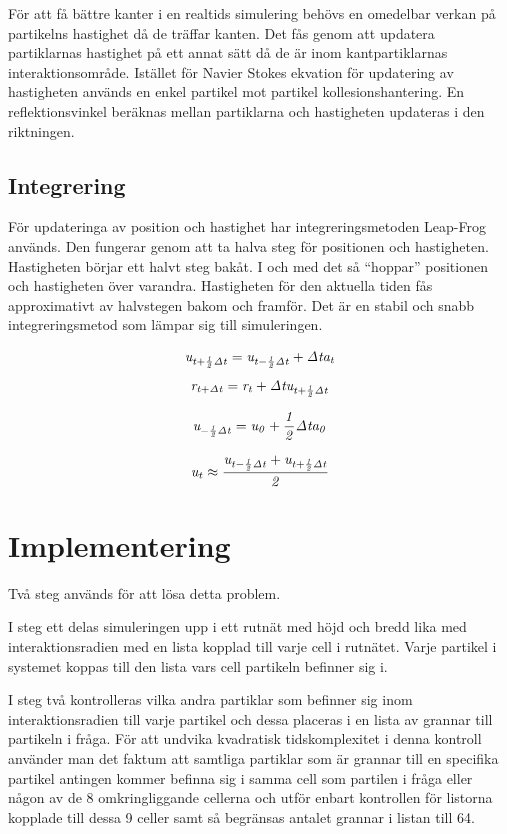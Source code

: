 \documentclass[a4paper,12pt,oneside,final]{extarticle}
\begin{document}
För att få bättre kanter i en realtids simulering behövs en omedelbar verkan på partikelns hastighet då de träffar kanten.
Det fås genom att updatera partiklarnas hastighet på ett annat sätt då de är inom kantpartiklarnas interaktionsområde.
Istället för Navier Stokes ekvation för updatering av hastigheten används en enkel partikel mot partikel kollesionshantering.
En reflektionsvinkel beräknas mellan partiklarna och hastigheten updateras i den riktningen.

\subsection{Integrering}
För updateringa av position och hastighet har integreringsmetoden Leap-Frog används. Den fungerar genom att ta halva steg för positionen och hastigheten.
Hastigheten börjar ett halvt steg bakåt.
I och med det så “hoppar” positionen och hastigheten över varandra.
Hastigheten för den aktuella tiden fås approximativt av halvstegen bakom och framför.
Det är en stabil och snabb integreringsmetod som lämpar sig till simuleringen.

\begin{equation}
{\it u_{t + \frac{1}{2} \Delta t} = u_{t - \frac{1}{2} \Delta t} + \Delta t a_t}
\end{equation}
\begin{equation}
{\it r_{t+ \Delta t} = r_t + \Delta t u_{t + \frac{1}{2} \Delta t }}
\end{equation}

\begin{equation}
{\it u_{-\frac{1}{2} \Delta t} = u_{0} + \frac{1}{2} \Delta t a_0}
\end{equation}

\begin{equation}
{\it u_t \approx \frac{u_{t - \frac{1}{2} \Delta t} + u_{t + \frac{1}{2} \Delta t} }{2} }
\end{equation}

\clearpage
\section{Implementering}
Två steg används för att lösa detta problem.

I steg ett delas simuleringen upp i ett rutnät med höjd och bredd lika med interaktionsradien med en lista kopplad till varje cell i rutnätet.
Varje partikel i systemet koppas till den lista vars cell partikeln befinner sig i.

I steg två kontrolleras vilka andra partiklar som befinner sig inom interaktionsradien till varje partikel och dessa placeras i en lista av grannar till partikeln i fråga.
För att undvika kvadratisk tidskomplexitet i denna kontroll använder man det faktum att samtliga partiklar som är grannar till en specifika partikel antingen kommer befinna sig i samma cell som partilen i fråga eller någon av de 8 omkringliggande cellerna och utför enbart kontrollen för listorna kopplade till dessa 9 celler samt så begränsas antalet grannar i listan till 64.
\end{document}
